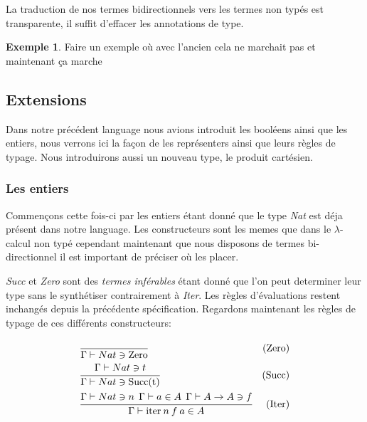 \documentclass {article}
\theoremstyle{definition}
\newtheorem{example}{Exemple}
\theoremstyle{remark}
\begin{document}
La traduction de nos termes bidirectionnels vers les termes non typés
est transparente, il suffit d'effacer les annotations de type.

\begin{example}
  Faire un exemple où avec l'ancien cela ne marchait pas et maintenant ça marche
\end{example}

\subsection{Extensions} 

Dans notre précédent language nous avions introduit les booléens ainsi que les entiers,
nous verrons ici la façon de les représenters ainsi que leurs règles de typage.
Nous introduirons aussi un nouveau type, le produit cartésien.

\subsubsection{Les entiers}
\label{entier_type}

Commençons cette fois-ci par les entiers étant donné que le type \emph{Nat}
est déja présent dans notre language.
Les constructeurs sont les memes que dans le \(\lambda\)-calcul non typé 
cependant maintenant que nous disposons de termes bi-directionnel il est important
de préciser où les placer.

\emph{Succ} et \emph{Zero} sont des \emph{termes inférables} étant donné que l'on peut determiner leur 
type sans le synthétiser contrairement à \emph{Iter}.
Les règles d'évaluations restent inchangés depuis la précédente spécification.
Regardons maintenant les règles de typage de ces différents constructeurs:
\begin{align*}
  &\cfrac{\:}
  {\Gamma\vdash Nat \ni \mathrm{Zero}}&\mbox{(Zero)} \\
  &\cfrac{\Gamma\vdash Nat \ni t}
  {\Gamma\vdash Nat \ni \mathrm{Succ(t)}}&\mbox{(Succ)} \\
  &\cfrac{\Gamma\vdash Nat \ni n \:\: \Gamma\vdash a \in A \:\: \Gamma\vdash A\rightarrow A \ni f}
  {\Gamma\vdash \mathrm{iter}\: n\: f\: a \in A}&\mbox{(Iter)} \\
\end{align*}
\end{document}
